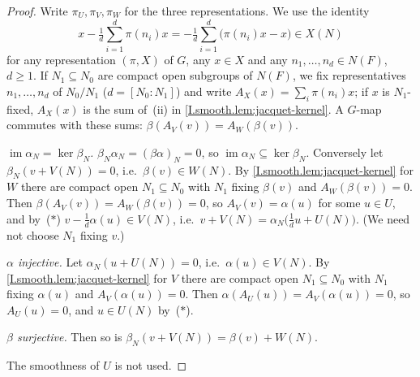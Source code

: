 \begin{theorem}
\end{theorem}
\begin{proof}
Write $\pi_U,\pi_V,\pi_W$ for the three representations. We use the identity
\[
  x-\tfrac1d\sum_{i=1}^d\pi(n_i)x=-\tfrac1d\sum_{i=1}^d\bigl(\pi(n_i)x-x\bigr)\in X(N)\tag{$\ast$}
\]
for any representation $(\pi,X)$ of $G$, any $x\in X$ and any $n_1,\dots,n_d\in N(F)$, $d\ge1$. If $N_1\subseteq N_0$ are
compact open subgroups of $N(F)$, we fix representatives $n_1,\dots,n_d$ of $N_0/N_1$ ($d=[N_0:N_1]$) and write
$A_X(x)=\sum_i\pi(n_i)x$; if $x$ is $N_1$-fixed, $A_X(x)$ is the sum of~(ii) in
\cref{I.smooth.lem:jacquet-kernel}. A $G$-map commutes with these sums: $\beta(A_V(v))=A_W(\beta(v))$.

\emph{$\operatorname{im}\alpha_N=\ker\beta_N$.} $\beta_N\alpha_N=(\beta\alpha)_N=0$, so
$\operatorname{im}\alpha_N\subseteq\ker\beta_N$. Conversely let $\beta_N(v+V(N))=0$, i.e.\ $\beta(v)\in W(N)$. By
\cref{I.smooth.lem:jacquet-kernel} for $W$ there are compact open $N_1\subseteq N_0$ with $N_1$ fixing $\beta(v)$ and
$A_W(\beta(v))=0$. Then $\beta(A_V(v))=A_W(\beta(v))=0$, so $A_V(v)=\alpha(u)$ for some $u\in U$, and by~($\ast$)
$v-\frac1d\alpha(u)\in V(N)$, i.e.\ $v+V(N)=\alpha_N\bigl(\tfrac1du+U(N)\bigr)$. (We need not choose $N_1$ fixing $v$.)

\emph{$\alpha$ injective.} Let $\alpha_N(u+U(N))=0$, i.e.\ $\alpha(u)\in V(N)$. By \cref{I.smooth.lem:jacquet-kernel}
for $V$ there are compact open $N_1\subseteq N_0$ with $N_1$ fixing $\alpha(u)$ and $A_V(\alpha(u))=0$. Then
$\alpha(A_U(u))=A_V(\alpha(u))=0$, so $A_U(u)=0$, and $u\in U(N)$ by~($\ast$).

\emph{$\beta$ surjective.} Then so is $\beta_N(v+V(N))=\beta(v)+W(N)$.

\noindent The smoothness of $U$ is not used.
\end{proof}

